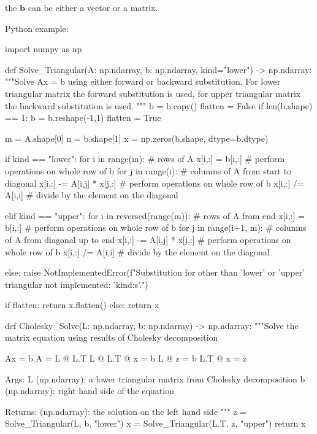 the $ \mathbf{b} $ can be either a vector or a matrix.

Python example:

\begin{python}
import numpy as np

def Solve_Triangular(A: np.ndarray, b: np.ndarray, kind="lower") -> np.ndarray:
    """Solve Ax = b using either forward or backward substitution. For lower
    triangular matrix the forward substitution is used, for upper triangular
    matrix the backward substitution is used.
    """
    b = b.copy()
    flatten = False
    if len(b.shape) == 1:
        b = b.reshape(-1,1)
        flatten = True

    m = A.shape[0]
    n = b.shape[1]
    x = np.zeros(b.shape, dtype=b.dtype)

    if kind == "lower":
        for i in range(m):                # rows of A
            x[i,:] = b[i,:]               # perform operations on whole row of b
            for j in range(i):            # columns of A from start to diagonal
                x[i,:] -= A[i,j] * x[j,:] # perform operations on whole row of b
            x[i,:] /= A[i,i]              # divide by the element on the diagonal

    elif kind == "upper":
        for i in reversed(range(m)):      # rows of A from end
            x[i,:] = b[i,:]               # perform operations on whole row of b
            for j in range(i+1, m):       # columns of A from diagonal up to end
                x[i,:] -= A[i,j] * x[j,:] # perform operations on whole row of b
            x[i,:] /= A[i,i]              # divide by the element on the diagonal

    else:
        raise NotImplementedError(f"Substitution for other than 'lower' or 'upper' triangular not implemented: '{kind:s}'.")

    if flatten:
        return x.flatten()
    else:
        return x


def Cholesky_Solve(L: np.ndarray, b: np.ndarray) -> np.ndarray:
    """Solve the matrix equation using results of Cholesky decomposition

        Ax = b
        A = L @ L.T
        L @ L.T @ x = b
        L @ z = b
        L.T @ x = z

    Args:
        L (np.ndarray): a lower triangular matrix from Cholesky decomposition
        b (np.ndarray): right hand side of the equation

    Returns:
        (np.ndarray): the solution on the left hand side
    """
    z = Solve_Triangular(L,   b, "lower")
    x = Solve_Triangular(L.T, z, "upper")
    return x

\end{python}


